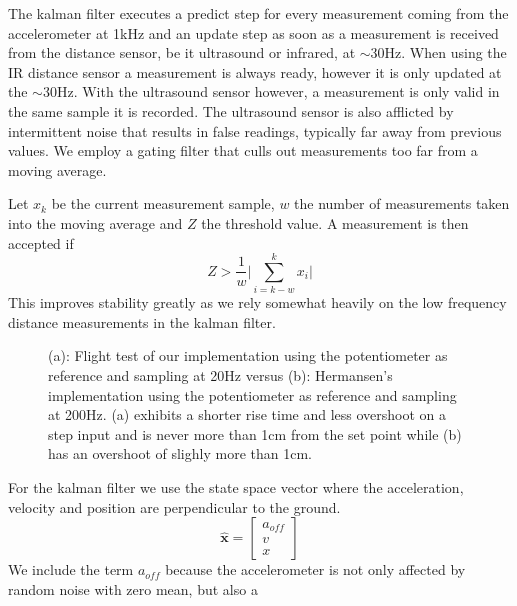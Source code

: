 The kalman filter executes a predict step for every measurement coming from the accelerometer at 1kHz and an update step as soon 
as a measurement is received from the distance sensor, be it ultrasound or infrared, at \(\sim\)30Hz. When using the IR distance 
sensor a measurement is always ready, however it is only updated at the \(\sim\)30Hz. With the ultrasound sensor however, a measurement
is only valid in the same sample it is recorded. The ultrasound sensor is also afflicted by intermittent noise that results in false readings,
typically far away from previous values. We employ a gating filter that culls out measurements too far from a moving average.

Let \(x_k\) be the current measurement sample, \(w\) the number of measurements taken into the moving average and \(Z\) the threshold value.
A measurement is then accepted if 
\begin{equation*}
	Z >\frac{1}{w} \lvert \sum_{i=k-w}^{k}x_i \rvert
\end{equation*}
This improves stability greatly as we rely somewhat heavily on the low frequency distance measurements in the kalman filter.
\begin{figure}
	\centering
	\subfloat[][]{\newlength\figureheight
		\newlength\figurewidth
		\setlength\figureheight{4cm}
		\setlength\figurewidth{7cm}
		
	}
	\subfloat[][]{\setlength\figureheight{4cm}
		\setlength\figurewidth{7cm}
		
	}
	\caption{(a): Flight test of our implementation using the potentiometer as reference and sampling at 20Hz versus (b):
	Hermansen's implementation using the potentiometer as reference and sampling at 200Hz. (a) exhibits a shorter rise time and less
	overshoot on a step input and is never more than 1cm from the set point while (b) has an overshoot of slighly more than 1cm.}
	\label{fig:pottest}
	\vspace{3pt}
	\hrulefill
\end{figure}
For the kalman filter we use the state space vector where the acceleration, velocity and position are perpendicular to the ground.
\begin{equation*}
	\hat{\mathbf{x}} = \begin{bmatrix}
		a_{off} \\
		v \\
		x
	\end{bmatrix}
\end{equation*}
We include the term \(a_{off}\) because the accelerometer is not only affected by random noise with zero mean, but also a 
